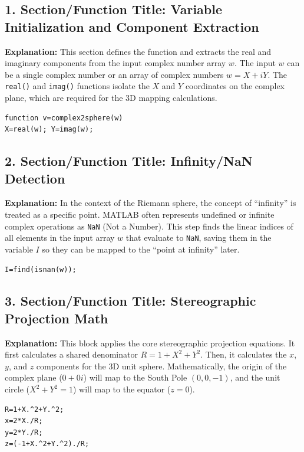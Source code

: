 \subsection*{1. Section/Function Title: Variable Initialization and Component Extraction}
\textbf{Explanation:} This section defines the function and extracts the real and imaginary components from the input complex number array $w$. 
The input $w$ can be a single complex number or an array of complex numbers $w = X + iY$. The \texttt{real()} and \texttt{imag()} functions isolate the $X$ and $Y$ coordinates on the complex plane, which are required for the 3D mapping calculations.

\begin{lstlisting}
function v=complex2sphere(w)
X=real(w); Y=imag(w);
\end{lstlisting}

\subsection*{2. Section/Function Title: Infinity/NaN Detection}
\textbf{Explanation:} In the context of the Riemann sphere, the concept of ``infinity'' is treated as a specific point. MATLAB often represents undefined or infinite complex operations as \texttt{NaN} (Not a Number). This step finds the linear indices of all elements in the input array $w$ that evaluate to \texttt{NaN}, saving them in the variable $I$ so they can be mapped to the ``point at infinity'' later.

\begin{lstlisting}
I=find(isnan(w));
\end{lstlisting}

\subsection*{3. Section/Function Title: Stereographic Projection Math}
\textbf{Explanation:} This block applies the core stereographic projection equations. It first calculates a shared denominator $R = 1 + X^2 + Y^2$. Then, it calculates the $x$, $y$, and $z$ components for the 3D unit sphere. 
Mathematically, the origin of the complex plane ($0 + 0i$) will map to the South Pole $(0, 0, -1)$, and the unit circle ($X^2 + Y^2 = 1$) will map to the equator ($z = 0$).

\begin{lstlisting}
R=1+X.^2+Y.^2;
x=2*X./R;
y=2*Y./R;
z=(-1+X.^2+Y.^2)./R;
\end{lstlisting}

